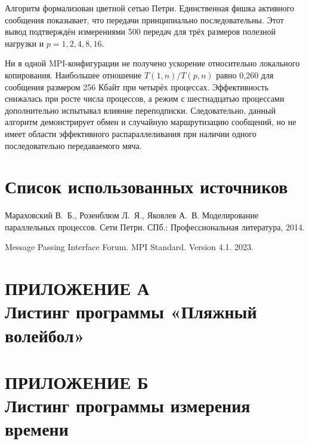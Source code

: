 \documentclass[14pt,a4paper]{extarticle}
\begin{document}
Алгоритм формализован цветной сетью Петри. Единственная фишка активного
сообщения показывает, что передачи принципиально последовательны. Этот вывод
подтверждён измерениями 500 передач для трёх размеров полезной нагрузки и
$p=1,2,4,8,16$.

Ни в одной MPI-конфигурации не получено ускорение относительно локального
копирования. Наибольшее отношение $T(1,n)/T(p,n)$ равно 0,260 для сообщения
размером 256 Кбайт при четырёх процессах. Эффективность снижалась при росте
числа процессов, а режим с шестнадцатью процессами дополнительно испытывал
влияние переподписки. Следовательно, данный алгоритм демонстрирует обмен и
случайную маршрутизацию сообщений, но не имеет области эффективного
распараллеливания при наличии одного последовательно передаваемого мяча.

\section{Список использованных источников}

\begin{enumerate}[label={[\arabic*]},leftmargin=1.25cm]
    \item Мараховский В.~Б., Розенблюм Л.~Я., Яковлев А.~В.
    Моделирование параллельных процессов. Сети Петри.
    СПб.: Профессиональная литература, 2014.
    \item Message Passing Interface Forum. MPI Standard. Version 4.1. 2023.
\end{enumerate}

\clearpage
{}
\section*{ПРИЛОЖЕНИЕ А\\Листинг программы «Пляжный волейбол»}


\clearpage
{}
\section*{ПРИЛОЖЕНИЕ Б\\Листинг программы измерения времени}

\end{document}
